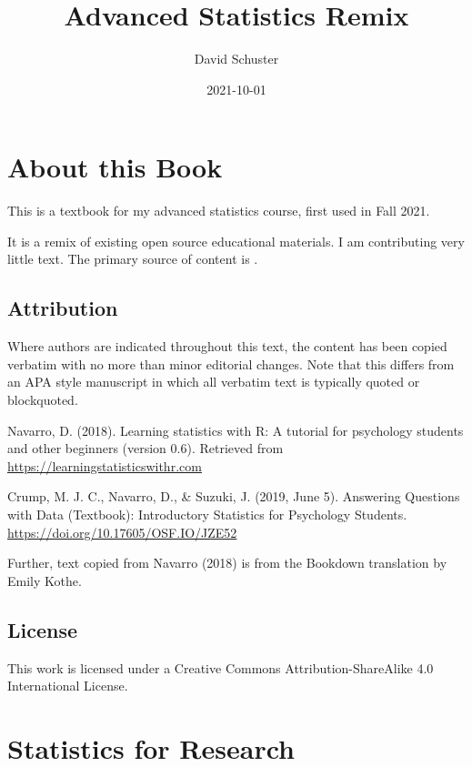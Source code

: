 \documentclass[
]{book}
\title{Advanced Statistics Remix}
\author{David Schuster}
\date{2021-10-01}
\begin{document}
\maketitle

{
\setcounter{tocdepth}{1}
\tableofcontents
}
\hypertarget{about-this-book}{%
\chapter*{About this Book}\label{about-this-book}}

This is a textbook for my advanced statistics course, first used in Fall 2021.

It is a remix of existing open source educational materials. I am contributing very little text. The primary source of content is \citet{Navarro2018}.

\hypertarget{attribution}{%
\section*{Attribution}\label{attribution}}

Where authors are indicated throughout this text, the content has been copied verbatim with no more than minor editorial changes. Note that this differs from an APA style manuscript in which all verbatim text is typically quoted or blockquoted.

Navarro, D. (2018). Learning statistics with R: A tutorial for psychology students and other beginners (version 0.6). Retrieved from \url{https://learningstatisticswithr.com}

Crump, M. J. C., Navarro, D., \& Suzuki, J. (2019, June 5). Answering Questions with Data (Textbook): Introductory Statistics for Psychology Students. \url{https://doi.org/10.17605/OSF.IO/JZE52}

Further, text copied from Navarro (2018) is from the Bookdown translation by Emily Kothe.

\hypertarget{license}{%
\section*{License}\label{license}}

This work is licensed under a Creative Commons Attribution-ShareAlike 4.0 International License.

\hypertarget{statistics-for-research}{%
\chapter{Statistics for Research}\label{statistics-for-research}}
\end{document}

